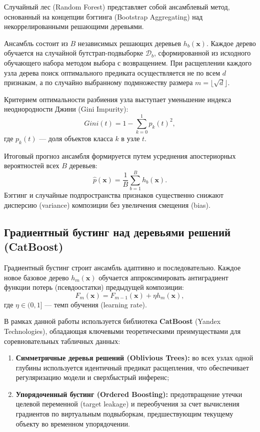 \documentclass[14pt, a4paper]{extarticle}
\begin{document}
Случайный лес (Random Forest) представляет собой ансамблевый метод, основанный на концепции бэггинга (Bootstrap Aggregating) над некоррелированными решающими деревьями. 

Ансамбль состоит из $B$ независимых решающих деревьев $h_b(\mathbf{x})$. Каждое дерево обучается на случайной бутстрап-подвыборке $\mathcal{D}_b$, сформированной из исходного обучающего набора методом выбора с возвращением. При расщеплении каждого узла дерева поиск оптимального предиката осуществляется не по всем $d$ признакам, а по случайно выбранному подмножеству размера $m = \lfloor\sqrt{d}\rfloor$.

Критерием оптимальности разбиения узла выступает уменьшение индекса неоднородности Джини (Gini Impurity):
\begin{equation}
Gini(t) = 1 - \sum_{k=0}^1 p_k(t)^2,
\end{equation}
где $p_k(t)$ --- доля объектов класса $k$ в узле $t$.

Итоговый прогноз ансамбля формируется путем усреднения апостериорных вероятностей всех $B$ деревьев:
\begin{equation}
\hat{p}(\mathbf{x}) = \frac{1}{B} \sum_{b=1}^B h_b(\mathbf{x}).
\end{equation}
Бэггинг и случайные подпространства признаков существенно снижают дисперсию (variance) композиции без увеличения смещения (bias).

\subsection{Градиентный бустинг над деревьями решений (CatBoost)}

Градиентный бустинг строит ансамбль адаптивно и последовательно. Каждое новое базовое дерево $h_m(\mathbf{x})$ обучается аппроксимировать антиградиент функции потерь (псевдоостатки) предыдущей композиции:
\begin{equation}
F_m(\mathbf{x}) = F_{m-1}(\mathbf{x}) + \eta h_m(\mathbf{x}),
\end{equation}
где $\eta \in (0, 1]$ --- темп обучения (learning rate).

В рамках данной работы используется библиотека \textbf{CatBoost} (Yandex Technologies), обладающая ключевыми теоретическими преимуществами для соревновательных табличных данных:
\begin{enumerate}
    \item \textbf{Симметричные деревья решений (Oblivious Trees):} во всех узлах одной глубины используется идентичный предикат расщепления, что обеспечивает регуляризацию модели и сверхбыстрый инференс;
    \item \textbf{Упорядоченный бустинг (Ordered Boosting):} предотвращение утечки целевой переменной (target leakage) и переобучения за счет вычисления градиентов по виртуальным подвыборкам, предшествующим текущему объекту во временном упорядочении.
\end{enumerate}
\end{document}
